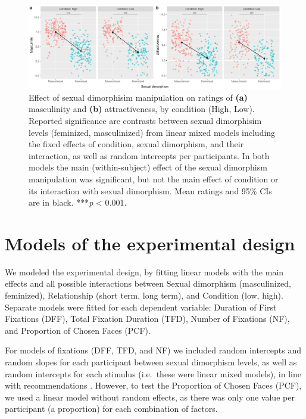 \documentclass[
  bookmarksnumbered]{article}
\begin{document}
\begin{figure}
\centering
\includegraphics{Supplementary_material_files/figure-latex/sex-dimor-check-plot-1.pdf}
\caption{\label{fig:sex-dimor-check-plot}Effect of sexual dimorphisim manipulation on ratings of \textbf{(a)} masculinity and \textbf{(b)} attractiveness, by condition (High, Low). Reported significance are contrasts between sexual dimorphisim levels (feminized, masculinized) from linear mixed models including the fixed effects of condition, sexual dimorphism, and their interaction, as well as random intercepts per participants. In both models the main (within-subject) effect of the sexual dimorphism manipulation was significant, but not the main effect of condition or its interaction with sexual dimorphism. Mean ratings and 95\% CIs are in black. ***\textit{p} \textless{} 0.001.}
\end{figure}

\section{Models of the experimental design}\label{experiment-models}

We modeled the experimental design, by fitting linear models with the main effects and all possible interactions between Sexual dimorphism (masculinized, feminized), Relationship (short term, long term), and Condition (low, high). Separate models were fitted for each dependent variable: Duration of First Fixations (DFF), Total Fixation Duration (TFD), Number of Fixations (NF), and Proportion of Chosen Faces (PCF).

For models of fixations (DFF, TFD, and NF) we included random intercepts and random slopes for each participant between sexual dimorphism levels, as well as random intercepts for each stimulus (i.e.~these were linear mixed models), in line with recommendations \autocite{barrRandomEffectsStructure2013}. However, to test the Proportion of Chosen Faces (PCF), we used a linear model without random effects, as there was only one value per participant (a proportion) for each combination of factors.
\end{document}
